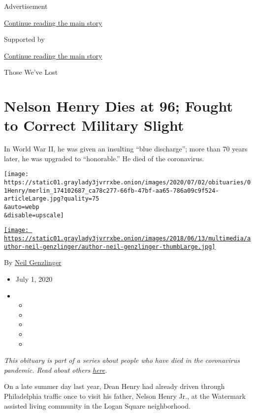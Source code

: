 Advertisement

\protect\hyperlink{after-top}{Continue reading the main story}

Supported by

\protect\hyperlink{after-sponsor}{Continue reading the main story}

Those We've Lost

\hypertarget{nelson-henry-dies-at-96-fought-to-correct-military-slight}{%
\section{Nelson Henry Dies at 96; Fought to Correct Military
Slight}\label{nelson-henry-dies-at-96-fought-to-correct-military-slight}}

In World War II, he was given an insulting ``blue discharge''; more than
70 years later, he was upgraded to ``honorable.'' He died of the
coronavirus.

\texttt{[image: https://static01.graylady3jvrrxbe.onion/images/2020/07/02/obituaries/01Henry/merlin\_174102687\_ca78c277-66fb-47bf-aa65-786a09c9f524-articleLarge.jpg?quality=75\\\&auto=webp\\\&disable=upscale]}

\href{https://www.nytimes3xbfgragh.onion/by/neil-genzlinger}{\texttt{[image: https://static01.graylady3jvrrxbe.onion/images/2018/06/13/multimedia/author-neil-genzlinger/author-neil-genzlinger-thumbLarge.jpg]}}

By \href{https://www.nytimes3xbfgragh.onion/by/neil-genzlinger}{Neil
Genzlinger}

\begin{itemize}
\item
  July 1, 2020
\item
  \begin{itemize}
  \item
  \item
  \item
  \item
  \item
  \end{itemize}
\end{itemize}

\emph{This obituary is part of a series about people who have died in
the coronavirus pandemic. Read about others}
\href{https://www.nytimes3xbfgragh.onion/interactive/2020/obituaries/people-died-coronavirus-obituaries.html}{\emph{here}}\emph{.}

On a late summer day last year, Dean Henry had already driven through
Philadelphia traffic once to visit his father, Nelson Henry Jr., at the
Watermark assisted living community in the Logan Square neighborhood.

